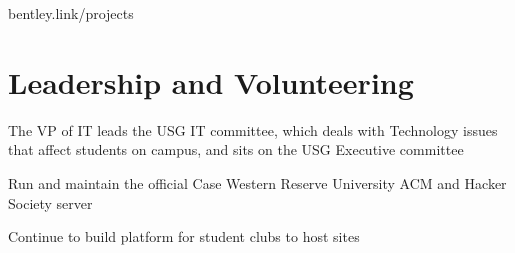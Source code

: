 \documentclass[letterpaper]{deedy-resume} %
\begin{document}
\begin{minipage}[t]{0.66\textwidth}
\sectionspace %

 bentley.link/projects
\sectionspace


\section{Leadership and Volunteering}


\begin{tightitemize}
\item The VP of IT leads the USG IT committee, which deals with Technology
  issues that affect students on campus, and sits on the USG Executive committee
\end{tightitemize}

\sectionspace %



\begin{tightitemize}
\item Run and maintain the official Case Western Reserve University ACM and
  Hacker Society server
\item Continue to build platform for student clubs to host sites
\end{tightitemize}



%
%


\end{minipage} %
\end{document}
